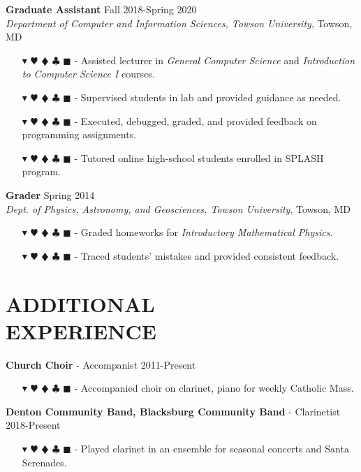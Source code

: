 \documentclass[overlapped, 10pt]{res} %
\newcommand{\physics}{$\blacktriangledown$}
\newcommand{\biochem}{$\varheartsuit$}
\newcommand{\shannon}{$\vardiamondsuit$}
\newcommand{\classic}{$\clubsuit$}
\newcommand{\quantum}{$\blacksquare$}
\newcommand{\physicscolor}{\color{YellowOrange}}
\newcommand{\biochemcolor}{\color{Emerald}}
\newcommand{\shannoncolor}{\color{Goldenrod}}
\newcommand{\classiccolor}{\color{Cyan}}
\newcommand{\quantumcolor}{\color{RedOrange}}
\newcommand{\tag}[1]{
    {\IfSubStr{#1}{\physics}{\physicscolor}{\color{White}}\physics}
    {\IfSubStr{#1}{\biochem}{\biochemcolor}{\color{White}}\biochem}
    {\IfSubStr{#1}{\shannon}{\shannoncolor}{\color{White}}\shannon}
    {\IfSubStr{#1}{\classic}{\classiccolor}{\color{White}}\classic}
    {\IfSubStr{#1}{\quantum}{\quantumcolor}{\color{White}}\quantum}
}
\begin{document}
\begin{resume}
\textbf{Graduate Assistant} \hfill Fall 2018-Spring 2020 \\
\textit{Department of Computer and Information Sciences, Towson University}, Towson, MD
\begin{itemize} \itemsep -2pt %
\item[\tag{\classic}-] Assisted lecturer in \textit{General Computer Science} and \textit{Introduction to Computer Science I} courses.
\item[\tag{\classic}-] Supervised students in lab and provided guidance as needed.
\item[\tag{\classic}-] Executed, debugged, graded, and provided feedback on programming assignments.
\item[\tag{\classic}-] Tutored online high-school students enrolled in SPLASH program.
\end{itemize}

\textbf{Grader} \hfill Spring 2014 \\
\textit{Dept. of Physics, Astronomy, and Geosciences, Towson University}, Towson, MD
\begin{itemize} \itemsep -2pt %
\item[\tag{\physics}-] Graded homeworks for \textit{Introductory Mathematical Physics}.
\item[\tag{\physics}-] Traced students' mistakes and provided consistent feedback.
\end{itemize}


\section{ADDITIONAL\\EXPERIENCE}

\textbf{Church Choir} - Accompanist \hfill 2011-Present
\begin{itemize} \itemsep -2pt %
\item[\tag{}-] Accompanied choir on clarinet, piano for weekly Catholic Mass.
\end{itemize}

\textbf{Denton Community Band, Blacksburg Community Band} - Clarinetist \hfill 2018-Present
\begin{itemize} \itemsep -2pt %
\item[\tag{}-] Played clarinet in an ensemble for seasonal concerts and Santa Serenades.
\end{itemize}


\end{resume}
\end{document}
